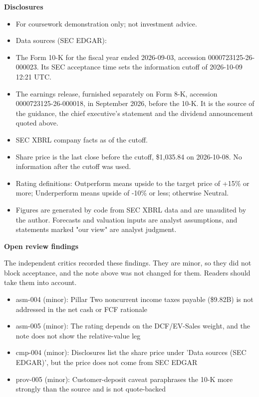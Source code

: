 \documentclass[a4paper,10pt]{article}
\begin{document}
\par\smallskip\textbf{\color{MemoBlue}Disclosures}\par

\begin{itemize}\setlength{\itemsep}{1pt}
\item For coursework demonstration only; not investment advice.
\item Data sources (SEC EDGAR):
\item The Form 10-K for the fiscal year ended 2026-09-03, accession 0000723125-26-000023. Its SEC acceptance time sets the information cutoff of 2026-10-09 12:21 UTC.
\item The earnings release, furnished separately on Form 8-K, accession 0000723125-26-000018, in September 2026, before the 10-K. It is the source of the guidance, the chief executive's statement and the dividend announcement quoted above.
\item SEC XBRL company facts as of the cutoff.
\item Share price is the last close before the cutoff, \$1,035.84 on 2026-10-08. No information after the cutoff was used.
\item Rating definitions: Outperform means upside to the target price of +15\% or more; Underperform means upside of -10\% or less; otherwise Neutral.
\item Figures are generated by code from SEC XBRL data and are unaudited by the author. Forecasts and valuation inputs are analyst assumptions, and statements marked "our view" are analyst judgment.
\end{itemize}

\par\smallskip\textbf{\color{MemoBlue}Open review findings}\par

The independent critics recorded these findings. They are minor, so they did not block acceptance, and the note above was not changed for them. Readers should take them into account.

\begin{itemize}\setlength{\itemsep}{1pt}
\item asm-004 (minor): Pillar Two noncurrent income taxes payable (\$9.82B) is not addressed in the net cash or FCF rationale
\item asm-005 (minor): The rating depends on the DCF/EV-Sales weight, and the note does not show the relative-value leg
\item cmp-004 (minor): Disclosures list the share price under 'Data sources (SEC EDGAR)', but the price does not come from SEC EDGAR
\item prov-005 (minor): Customer-deposit caveat paraphrases the 10-K more strongly than the source and is not quote-backed
\end{itemize}
\end{document}
